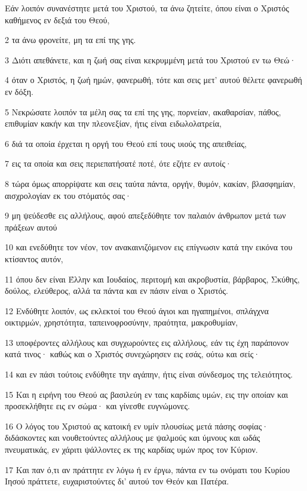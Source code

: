 \par Εάν λοιπόν συνανέστητε μετά του Χριστού, τα άνω ζητείτε, όπου είναι ο Χριστός καθήμενος εν δεξιά του Θεού,
\par 2 τα άνω φρονείτε, μη τα επί της γης.
\par 3 Διότι απεθάνετε, και η ζωή σας είναι κεκρυμμένη μετά του Χριστού εν τω Θεώ·
\par 4 όταν ο Χριστός, η ζωή ημών, φανερωθή, τότε και σεις μετ' αυτού θέλετε φανερωθή εν δόξη.
\par 5 Νεκρώσατε λοιπόν τα μέλη σας τα επί της γης, πορνείαν, ακαθαρσίαν, πάθος, επιθυμίαν κακήν και την πλεονεξίαν, ήτις είναι ειδωλολατρεία,
\par 6 διά τα οποία έρχεται η οργή του Θεού επί τους υιούς της απειθείας,
\par 7 εις τα οποία και σεις περιεπατήσατέ ποτέ, ότε εζήτε εν αυτοίς·
\par 8 τώρα όμως απορρίψατε και σεις ταύτα πάντα, οργήν, θυμόν, κακίαν, βλασφημίαν, αισχρολογίαν εκ του στόματός σας·
\par 9 μη ψεύδεσθε εις αλλήλους, αφού απεξεδύθητε τον παλαιόν άνθρωπον μετά των πράξεων αυτού
\par 10 και ενεδύθητε τον νέον, τον ανακαινιζόμενον εις επίγνωσιν κατά την εικόνα του κτίσαντος αυτόν,
\par 11 όπου δεν είναι Έλλην και Ιουδαίος, περιτομή και ακροβυστία, βάρβαρος, Σκύθης, δούλος, ελεύθερος, αλλά τα πάντα και εν πάσιν είναι ο Χριστός.
\par 12 Ενδύθητε λοιπόν, ως εκλεκτοί του Θεού άγιοι και ηγαπημένοι, σπλάγχνα οικτιρμών, χρηστότητα, ταπεινοφροσύνην, πραότητα, μακροθυμίαν,
\par 13 υποφέροντες αλλήλους και συγχωρούντες εις αλλήλους, εάν τις έχη παράπονον κατά τινος· καθώς και ο Χριστός συνεχώρησεν εις εσάς, ούτω και σείς·
\par 14 και εν πάσι τούτοις ενδύθητε την αγάπην, ήτις είναι σύνδεσμος της τελειότητος.
\par 15 Και η ειρήνη του Θεού ας βασιλεύη εν ταις καρδίαις υμών, εις την οποίαν και προσεκλήθητε εις εν σώμα· και γίνεσθε ευγνώμονες.
\par 16 Ο λόγος του Χριστού ας κατοική εν υμίν πλουσίως μετά πάσης σοφίας· διδάσκοντες και νουθετούντες αλλήλους με ψαλμούς και ύμνους και ωδάς πνευματικάς, εν χάριτι ψάλλοντες εκ της καρδίας υμών προς τον Κύριον.
\par 17 Και παν ό,τι αν πράττητε εν λόγω ή εν έργω, πάντα εν τω ονόματι του Κυρίου Ιησού πράττετε, ευχαριστούντες δι' αυτού τον Θεόν και Πατέρα.
